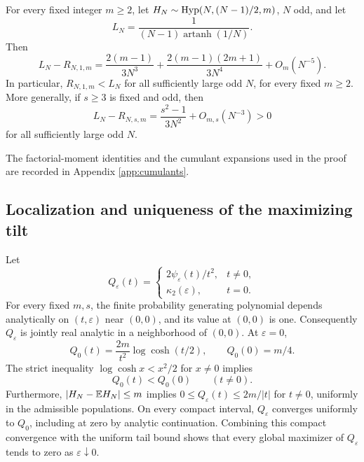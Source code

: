 \begin{corollary}\label{cor:fixedm_gap}
For every fixed integer $m\ge2$, let $H_N\sim\operatorname{Hyp}(N,(N-1)/2,m)$, $N$ odd, and let
\[
 L_N=\frac{1}{(N-1)\operatorname{artanh}(1/N)}.
\]
Then
\begin{equation}\label{eq:fixedgap}
 \boxed{\quad L_N-R_{N,1,m}
 =\frac{2(m-1)}{3N^3}
 +\frac{2(m-1)(2m+1)}{3N^4}+O_m(N^{-5}).\quad}
\end{equation}
In particular, $R_{N,1,m}<L_N$ for all sufficiently large odd $N$, for every fixed $m\ge2$. More generally, if $s\ge3$ is fixed and odd, then
\begin{equation}\label{eq:offs_gap}
 L_N-R_{N,s,m}=\frac{s^2-1}{3N^2}+O_{m,s}(N^{-3})>0
\end{equation}
for all sufficiently large odd $N$.
\end{corollary}

The factorial-moment identities and the cumulant expansions used in the proof are recorded in Appendix \ref{app:cumulants}.

\subsection{Localization and uniqueness of the maximizing tilt}
Let
\[
 Q_\varepsilon(t)=\begin{cases}
  2\psi_\varepsilon(t)/t^2,&t\ne0,\\
  \kappa_2(\varepsilon),&t=0.
 \end{cases}
\]
For every fixed $m,s$, the finite probability generating polynomial depends analytically on $(t,\varepsilon)$ near $(0,0)$, and its value at $(0,0)$ is one. Consequently $Q_\varepsilon$ is jointly real analytic in a neighborhood of $(0,0)$. At $\varepsilon=0$,
\begin{equation}\label{eq:q0}
 Q_0(t)=\frac{2m}{t^2}\log\cosh(t/2),\qquad Q_0(0)=m/4.
\end{equation}
The strict inequality $\log\cosh x<x^2/2$ for $x\ne0$ implies
\begin{equation}\label{eq:qstrict}
 Q_0(t)<Q_0(0)\qquad(t\ne0).
\end{equation}
Furthermore, $|H_N-\mathbb E H_N|\le m$ implies $0\le Q_\varepsilon(t)\le2m/|t|$ for $t\ne0$, uniformly in the admissible populations. On every compact interval, $Q_\varepsilon$ converges uniformly to $Q_0$, including at zero by analytic continuation. Combining this compact convergence with the uniform tail bound shows that every global maximizer of $Q_\varepsilon$ tends to zero as $\varepsilon\downarrow0$.

